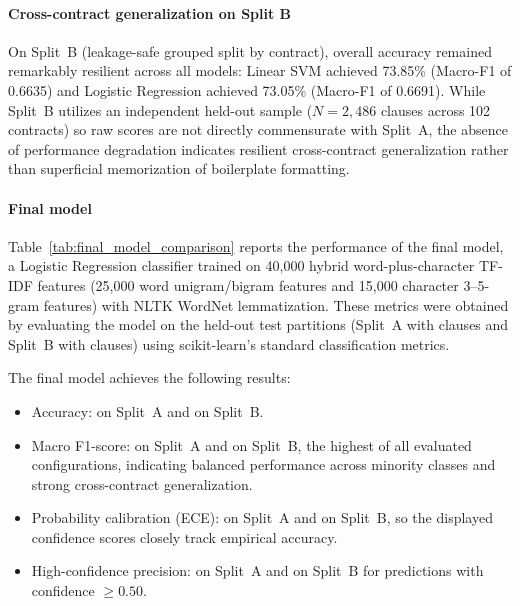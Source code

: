 \paragraph*{Cross-contract generalization on Split B}
On Split~B (leakage-safe grouped split by contract), overall accuracy remained remarkably resilient across all models: Linear SVM achieved 73.85\% (Macro-F1 of 0.6635) and Logistic Regression achieved 73.05\% (Macro-F1 of 0.6691). While Split~B utilizes an independent held-out sample ($N = 2,486$ clauses across 102 contracts) so raw scores are not directly commensurate with Split~A, the absence of performance degradation indicates resilient cross-contract generalization rather than superficial memorization of boilerplate formatting.

\paragraph*{Final model}
Table~\ref{tab:final_model_comparison} reports the performance of the final model, a Logistic Regression classifier trained on 40,000 hybrid word-plus-character TF-IDF features (25,000 word unigram/bigram features and 15,000 character 3--5-gram features) with NLTK WordNet lemmatization. These metrics were obtained by evaluating the model on the held-out test partitions (Split~A with \SplitATestClauses{} clauses and Split~B with \SplitBTestClauses{} clauses) using scikit-learn's standard classification metrics.



The final model achieves the following results:
\begin{itemize}
    \item Accuracy: \FinalSplitAAcc{} on Split~A and \FinalSplitBAcc{} on Split~B.
    \item Macro F1-score: \FinalSplitAMacroFScore{} on Split~A and \FinalSplitBMacroFScore{} on Split~B, the highest of all evaluated configurations, indicating balanced performance across minority classes and strong cross-contract generalization.
    \item Probability calibration (ECE): \FinalSplitAECE{} on Split~A and \FinalSplitBECE{} on Split~B, so the displayed confidence scores closely track empirical accuracy.
    \item High-confidence precision: \FinalSplitAHighConfPrec{} on Split~A and \FinalSplitBHighConfPrec{} on Split~B for predictions with confidence $\ge 0.50$.
\end{itemize}

